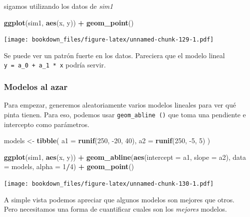 \documentclass[]{book}
\newenvironment{Shaded}{\begin{snugshade}}{\end{snugshade}}
\newcommand{\DataTypeTok}[1]{\textcolor[rgb]{0.13,0.29,0.53}{#1}}
\newcommand{\DecValTok}[1]{\textcolor[rgb]{0.00,0.00,0.81}{#1}}
\newcommand{\KeywordTok}[1]{\textcolor[rgb]{0.13,0.29,0.53}{\textbf{#1}}}
\newcommand{\NormalTok}[1]{#1}
\newcommand{\OperatorTok}[1]{\textcolor[rgb]{0.81,0.36,0.00}{\textbf{#1}}}
\newcommand{\StringTok}[1]{\textcolor[rgb]{0.31,0.60,0.02}{#1}}
\begin{document}
sigamos utilizando los datos de \emph{sim1}

\begin{Shaded}
\begin{Highlighting}[]
\KeywordTok{ggplot}\NormalTok{(sim1, }\KeywordTok{aes}\NormalTok{(x, y)) }\OperatorTok{+}\StringTok{ }
\StringTok{  }\KeywordTok{geom_point}\NormalTok{()}
\end{Highlighting}
\end{Shaded}

\texttt{[image: bookdown\_files/figure-latex/unnamed-chunk-129-1.pdf]}

Se puede ver un patrón fuerte en los datos. Pareciera que el modelo lineal \texttt{y\ =\ a\_0\ +\ a\_1\ *\ x} podría servir.

\hypertarget{modelos-al-azar}{%
\subsubsection{Modelos al azar}\label{modelos-al-azar}}

Para empezar, generemos aleatoriamente varios modelos lineales para ver qué pinta tienen. Para eso, podemos usar \texttt{geom\_abline\ ()} que toma una pendiente e intercepto como parámetros.

\begin{Shaded}
\begin{Highlighting}[]
\NormalTok{models <-}\StringTok{ }\KeywordTok{tibble}\NormalTok{(}
  \DataTypeTok{a1 =} \KeywordTok{runif}\NormalTok{(}\DecValTok{250}\NormalTok{, }\DecValTok{-20}\NormalTok{, }\DecValTok{40}\NormalTok{),}
  \DataTypeTok{a2 =} \KeywordTok{runif}\NormalTok{(}\DecValTok{250}\NormalTok{, }\DecValTok{-5}\NormalTok{, }\DecValTok{5}\NormalTok{)}
\NormalTok{)}

\KeywordTok{ggplot}\NormalTok{(sim1, }\KeywordTok{aes}\NormalTok{(x, y)) }\OperatorTok{+}\StringTok{ }
\StringTok{  }\KeywordTok{geom_abline}\NormalTok{(}\KeywordTok{aes}\NormalTok{(}\DataTypeTok{intercept =}\NormalTok{ a1, }\DataTypeTok{slope =}\NormalTok{ a2), }\DataTypeTok{data =}\NormalTok{ models, }\DataTypeTok{alpha =} \DecValTok{1}\OperatorTok{/}\DecValTok{4}\NormalTok{) }\OperatorTok{+}
\StringTok{  }\KeywordTok{geom_point}\NormalTok{() }
\end{Highlighting}
\end{Shaded}

\texttt{[image: bookdown\_files/figure-latex/unnamed-chunk-130-1.pdf]}

A simple vista podemos apreciar que algunos modelos son mejores que otros. Pero necesitamos una forma de cuantificar cuales son los \emph{mejores} modelos.
\end{document}
